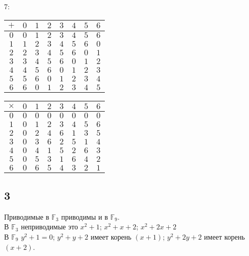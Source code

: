 		7:
		\begin{center}
			\begin{tabular}{|c|c|c|c|c|c|c|c|}
				\hline
				$+ $&$ 0 $&$ 1 $&$ 2 $&$ 3 $&$ 4 $&$ 5 $&$ 6$\\
				\hline
				$0 $&$ 0 $&$ 1 $&$ 2 $&$ 3 $&$ 4 $&$ 5 $&$ 6$\\
				\hline
				$1 $&$ 1 $&$ 2 $&$ 3 $&$ 4 $&$ 5 $&$ 6 $&$ 0$\\
				\hline
				$2 $&$ 2 $&$ 3 $&$ 4 $&$ 5 $&$ 6 $&$ 0 $&$ 1$\\
				\hline
				$3 $&$ 3 $&$ 4 $&$ 5 $&$ 6 $&$ 0 $&$ 1 $&$ 2$\\
				\hline
				$4 $&$ 4 $&$ 5 $&$ 6 $&$ 0 $&$ 1 $&$ 2 $&$ 3$\\
				\hline
				$5 $&$ 5 $&$ 6 $&$ 0 $&$ 1 $&$ 2 $&$ 3 $&$ 4$\\
				\hline
				$6 $&$ 6 $&$ 0 $&$ 1 $&$ 2 $&$ 3 $&$ 4 $&$ 5$\\
				\hline
			\end{tabular}
		\end{center}
		\begin{center}
			\begin{tabular}{|c|c|c|c|c|c|c|c|}
				\hline
				$\times $&$ 0 $&$ 1 $&$ 2 $&$ 3 $&$ 4 $&$ 5 $&$ 6$\\
				\hline
				$0 $&$ 0 $&$ 0 $&$ 0 $&$ 0 $&$ 0 $&$ 0 $&$ 0$\\
				\hline
				$1 $&$ 0 $&$ 1 $&$ 2 $&$ 3 $&$ 4 $&$ 5 $&$ 6$\\
				\hline
				$2 $&$ 0 $&$ 2 $&$ 4 $&$ 6 $&$ 1 $&$ 3 $&$ 5$\\
				\hline
				$3 $&$ 0 $&$ 3 $&$ 6 $&$ 2 $&$ 5 $&$ 1 $&$ 4$\\
				\hline
				$4 $&$ 0 $&$ 4 $&$ 1 $&$ 5 $&$ 2 $&$ 6 $&$ 3$\\
				\hline
				$5 $&$ 0 $&$ 5 $&$ 3 $&$ 1 $&$ 6 $&$ 4 $&$ 2$\\
				\hline
				$6 $&$ 0 $&$ 6 $&$ 5 $&$ 4 $&$ 3 $&$ 2 $&$ 1$\\
				\hline
			\end{tabular}
		\end{center}
\newpage
		\subsection{3}
		Приводимые в $\mathbb{F}_3$ приводимы и в $\mathbb{F}_9$.\\
		В $\mathbb{F}_3$ неприводимые это $x^2 + 1$; $x^2 + x + 2$; $x^2 + 2x + 2$\\
		В $\mathbb{F}_9$ $y^2 + 1 = 0$; $y^2 + y + 2$ имеет корень $(x + 1)$; $y^2 + 2y + 2$ имеет корень $(x + 2)$.
		\\
